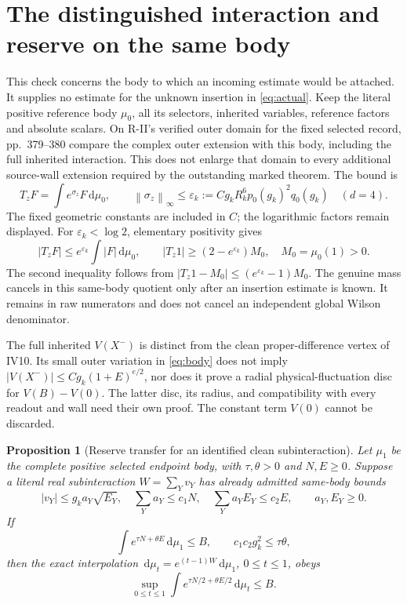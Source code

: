 \documentclass[11pt,letterpaper]{article}
\theoremstyle{plain}
\newtheorem{proposition}[theorem]{Proposition}
\theoremstyle{remark}\newtheorem{remark}[theorem]{Scope}
\newcommand{\dd}{\,\mathrm d}\newcommand{\eps}{\varepsilon}
\newcommand{\norm}[1]{\left\lVert#1\right\rVert}
\begin{document}
\section{The distinguished interaction and reserve on the same body}

This check concerns the body to which an incoming estimate would be
attached. It supplies no estimate for the unknown insertion in
\eqref{eq:actual}. Keep the literal positive reference body $\mu_0$, all
its selectors, inherited variables, reference factors and absolute scalars.
On R-II's verified outer domain for the fixed selected record, pp.\ 379--380
compare the complex outer extension with this body, including the full
inherited interaction. This does not enlarge that domain to every additional
source-wall extension required by the outstanding marked theorem. The bound is
\begin{equation}
 T_zF=\int e^{\sigma_z}F\dd\mu_0,
 \qquad \norm{\sigma_z}_\infty
 \le\eps_k:=Cg_kR_k^6p_0(g_k)^2q_0(g_k)
 \quad(d=4).
 \label{eq:body}
\end{equation}
The fixed geometric constants are included in $C$; the logarithmic factors
remain displayed. For $\eps_k<\log2$, elementary positivity gives
\begin{equation}
 |T_zF|\le e^{\eps_k}\int|F|\dd\mu_0,\qquad
 |T_z1|\ge(2-e^{\eps_k})M_0,
 \quad M_0=\mu_0(1)>0.
 \label{eq:mass}
\end{equation}
The second inequality follows from
$|T_z1-M_0|\le(e^{\eps_k}-1)M_0$.
The genuine mass cancels in this same-body quotient only after an insertion
estimate is known. It remains in raw numerators and does not cancel an
independent global Wilson denominator.

The full inherited $V(X^-)$ is distinct from the clean proper-difference
vertex of IV10. Its small outer variation in \eqref{eq:body} does not
imply $|V(X^-)|\le Cg_k(1+E)^{e/2}$, nor does it prove a radial
physical-fluctuation disc for $V(B)-V(0)$. The latter disc, its radius,
and compatibility with every readout and wall need their own proof.
The constant term $V(0)$ cannot be discarded.

\begin{proposition}[Reserve transfer for an identified clean subinteraction]
Let $\mu_1$ be the complete positive selected endpoint body, with
$\tau,\theta>0$ and $N,E\ge0$. Suppose a
\emph{literal} real subinteraction $W=\sum_Yv_Y$ has already admitted
same-body bounds
\begin{equation}
 |v_Y|\le g_ka_Y\sqrt{E_Y},\quad
 \sum_Ya_Y\le c_1N,\quad
 \sum_Ya_YE_Y\le c_2E,
 \qquad a_Y,E_Y\ge0.
\end{equation}
If
\begin{equation}
 \int e^{\tau N+\theta E}\dd\mu_1\le B,
 \qquad c_1c_2g_k^2\le\tau\theta,
\end{equation}
then the exact interpolation
$\dd\mu_t=e^{(t-1)W}\dd\mu_1$, $0\le t\le1$, obeys
\begin{equation}
 \sup_{0\le t\le1}\int e^{\tau N/2+\theta E/2}\dd\mu_t\le B.
 \label{eq:reserve}
\end{equation}
\end{proposition}
\end{document}
